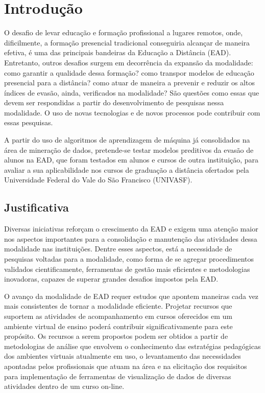 \chapter{Introdução}

O desafio de levar educação e formação profissional a lugares remotos, onde,
dificilmente, a formação presencial tradicional conseguiria alcançar de maneira
efetiva, é uma das principais bandeiras da Educação a Distância (EAD).
Entretanto, outros desafios surgem em decorrência da expansão da modalidade:
como garantir a qualidade dessa formação? como transpor modelos de educação
presencial para a distância? como atuar de maneira a prevenir e reduzir os altos
índices de evasão, ainda, verificados na modalidade? São questões como essas que
devem ser respondidas a partir do desenvolvimento de pesquisas nessa modalidade.
O uso de novas tecnologias e de novos processos pode contribuir com essas
pesquisas.

A partir do uso de algoritmos de aprendizagem de máquina já consolidados na área
de mineração de dados, pretende-se testar modelos preditivos da evasão de alunos
na EAD, que foram testados em alunos e cursos de outra instituição, para
avaliar a sua aplicabilidade nos cursos de graduação a distância
ofertados pela Universidade Federal do Vale do São Francisco (UNIVASF).

\section{Justificativa}

Diversas iniciativas reforçam o crescimento da EAD e exigem uma atenção maior
nos aspectos importantes para a consolidação e manutenção das atividades dessa
modalidade nas instituições. Dentre esses aspectos, está a necessidade de
pesquisas voltadas para a modalidade, como forma de se agregar procedimentos
validados cientificamente, ferramentas de gestão mais eficientes e metodologias
inovadoras, capazes de superar grandes desafios impostos pela EAD.

O avanço da modalidade de EAD requer estudos que apontem maneiras cada vez mais
consistentes de tornar a modalidade eficiente. Projetar recursos que suportem as
atividades de acompanhamento em cursos oferecidos em um ambiente virtual de
ensino poderá contribuir significativamente para este propósito. Os recursos a
serem propostos podem ser obtidos a partir de metodologias de análise que
envolvem o conhecimento das estratégias pedagógicas dos ambientes virtuais
atualmente em uso, o levantamento das necessidades apontadas pelos profissionais
que atuam na área e na elicitação dos requisitos para implementação de
ferramentas de visualização de dados de diversas atividades dentro de um curso
on-line. \cite{ramos2016abordagem}

